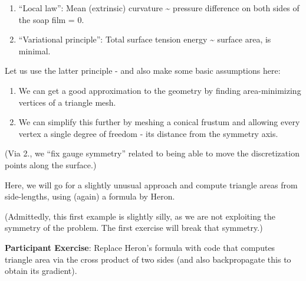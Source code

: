 \documentclass[11pt]{article}
\providecommand{\tightlist}{%
      \setlength{\itemsep}{0pt}\setlength{\parskip}{0pt}}
\begin{document}
\begin{enumerate}
\def\labelenumi{\arabic{enumi}.}
\tightlist
\item
  ``Local law'': Mean (extrinsic) curvature \textasciitilde{} pressure
  difference on both sides of the soap film = 0.
\item
  ``Variational principle'': Total surface tension energy
  \textasciitilde{} surface area, is minimal.
\end{enumerate}

Let us use the latter principle - and also make some basic assumptions
here:

\begin{enumerate}
\def\labelenumi{\arabic{enumi}.}
\tightlist
\item
  We can get a good approximation to the geometry by finding
  area-minimizing vertices of a triangle mesh.
\item
  We can simplify this further by meshing a conical frustum and allowing
  every vertex a single degree of freedom - its distance from the
  symmetry axis.
\end{enumerate}

(Via 2., we ``fix gauge symmetry'' related to being able to move the
discretization points along the surface.)

Here, we will go for a slightly unusual approach and compute triangle
areas from side-lengths, using (again) a formula by Heron.

(Admittedly, this first example is slightly silly, as we are not
exploiting the symmetry of the problem. The first exercise will break
that symmetry.)

\textbf{Participant Exercise}: Replace Heron's formula with code that
computes triangle area via the cross product of two sides (and also
backpropagate this to obtain its gradient).
\end{document}
